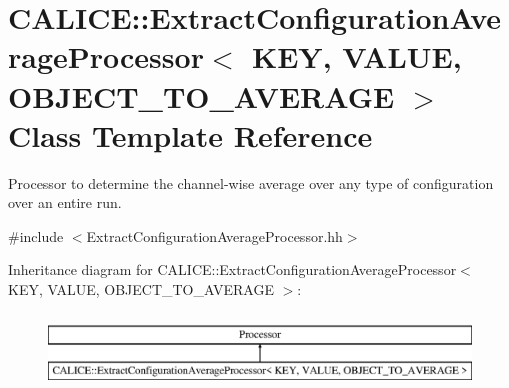 \section{C\-A\-L\-I\-C\-E\-:\-:Extract\-Configuration\-Average\-Processor$<$ K\-E\-Y, V\-A\-L\-U\-E, O\-B\-J\-E\-C\-T\-\_\-\-T\-O\-\_\-\-A\-V\-E\-R\-A\-G\-E $>$ Class Template Reference}
\label{classCALICE_1_1ExtractConfigurationAverageProcessor}


Processor to determine the channel-\/wise average over any type of configuration over an entire run.  




{\ttfamily \#include $<$Extract\-Configuration\-Average\-Processor.\-hh$>$}

Inheritance diagram for C\-A\-L\-I\-C\-E\-:\-:Extract\-Configuration\-Average\-Processor$<$ K\-E\-Y, V\-A\-L\-U\-E, O\-B\-J\-E\-C\-T\-\_\-\-T\-O\-\_\-\-A\-V\-E\-R\-A\-G\-E $>$\-:\begin{figure}[H]
\begin{center}
\leavevmode
\includegraphics[height=2.000000cm]{classCALICE_1_1ExtractConfigurationAverageProcessor}
\end{center}
\end{figure}
